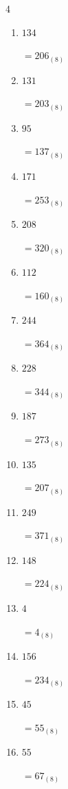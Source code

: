 \begin{multicols}{4}
\begin{enumerate}
        $=63_{(8)}$

  \item $134$

        $=206_{(8)}$

  \item $131$

        $=203_{(8)}$

  \item $95$

        $=137_{(8)}$

  \item $171$

        $=253_{(8)}$

  \item $208$

        $=320_{(8)}$

  \item $112$

        $=160_{(8)}$

  \item $244$

        $=364_{(8)}$

  \item $228$

        $=344_{(8)}$

\columnbreak %

  \item $187$

        $=273_{(8)}$

  \item $135$

        $=207_{(8)}$

  \item $249$

        $=371_{(8)}$

  \item $148$

        $=224_{(8)}$

  \item $4$

        $=4_{(8)}$

  \item $156$

        $=234_{(8)}$

  \item $45$

        $=55_{(8)}$

  \item $55$

        $=67_{(8)}$


\end{enumerate}
\end{multicols}
